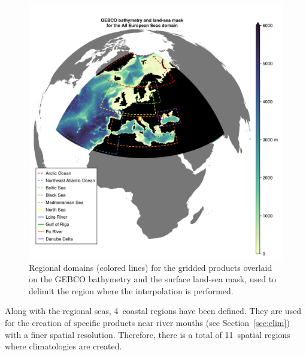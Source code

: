 \documentclass[essd, manuscript]{copernicus}
\begin{document}
\begin{figure}[t]
\includegraphics[width=12cm]{gebco_bathy_mask_domains3}
\caption{Regional domains (colored lines) for the gridded products overlaid on the GEBCO bathymetry and the surface land-sea mask, used to delimit the region where the interpolation is performed.\label{fig:gebco_bathy_mask_domains3}}
\end{figure}

Along with the regional seas, 4~coastal regions have been defined. They are used for the creation of specific products near river mouths (see Section~\ref{sec:clim}) with a finer spatial resolution. Therefore, there is a total of 11~spatial regions where climatologies are created.
\end{document}
